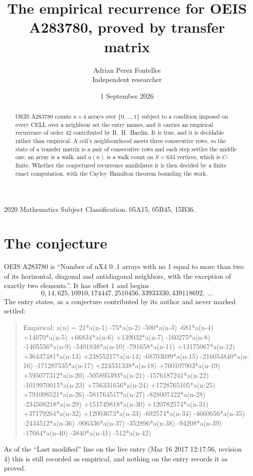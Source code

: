 \documentclass[11pt,a4paper]{article}
\title{The empirical recurrence for OEIS A283780, proved by transfer matrix}
\author{Adrian Perez Fontelles\\ \small Independent researcher}
\date{1 September 2026}
\theoremstyle{plain}
\theoremstyle{definition}
\begin{document}
\maketitle

\begin{abstract}
OEIS A283780 counts $n\times4$ arrays over $\{0,\dots,1\}$ subject to a condition imposed on
every CELL over a neighbour set the entry names, and it carries an empirical recurrence of
order $42$ contributed by R.~H.~Hardin. It is true, and it is decidable rather than
empirical. A cell's neighbourhood meets three consecutive rows, so the state of a transfer
matrix is a pair of consecutive rows and each step settles the middle one; an array is a
walk, and $a(n)$ is a walk count on $S=633$ vertices, which is $C$-finite. Whether the
conjectured recurrence annihilates it is then decided by a finite exact computation, with the
Cayley--Hamilton theorem bounding the work.
\end{abstract}

\noindent\small 2020 Mathematics Subject Classification. 05A15, 05B45, 15B36.\normalsize

\section{The conjecture}

OEIS A283780 is ``Number of nX4 0..1 arrays with no 1 equal to more than two of its horizontal, diagonal and antidiagonal neighbors, with the exception of exactly two elements.''. It has offset $1$ and begins
\[
0, 14, 625, 10910, 174447, 2510456, 33933330, 439118692,\ \dots
\]
The entry states, as a conjecture contributed by its author and never marked settled:
\begin{quote}
Empirical: a(n) = 21*a(n-1) -75*a(n-2) -500*a(n-3) -681*a(n-4) +14070*a(n-5) +66834*a(n-6) +139032*a(n-7) -160275*a(n-8) -1405556*a(n-9) -3401838*a(n-10) -791658*a(n-11) +13175067*a(n-12) +36437481*a(n-13) +23855217*a(n-14) -68703699*a(n-15) -216054840*a(n-16) -171287535*a(n-17) +224531338*a(n-18) +760107903*a(n-19) +595077312*a(n-20) -505895393*a(n-21) -1576187241*a(n-22) -1019970015*a(n-23) +756331656*a(n-24) +1728765105*a(n-25) +791098521*a(n-26) -581764517*a(n-27) -828007422*a(n-28) -234508218*a(n-29) +151749818*a(n-30) +120782574*a(n-31) +37179264*a(n-32) +12003673*a(n-33) -692574*a(n-34) -4660656*a(n-35) -2434512*a(n-36) -906336*a(n-37) -352896*a(n-38) -94208*a(n-39) -17664*a(n-40) -3840*a(n-41) -512*a(n-42)
\end{quote}
As of the ``Last modified'' line on the live entry (Mar 16 2017 12:17:56, revision 4) this is still
recorded as empirical, and nothing on the entry records it as proved.
\end{document}
